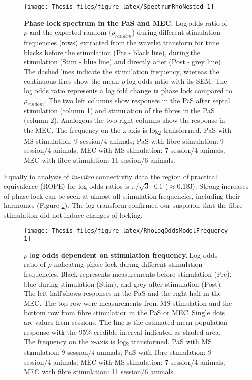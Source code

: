\documentclass[
  12pt,
  a4paper,
  openany]{book}
\begin{document}
\FloatBarrier




\begin{figure}[htbp]

{\centering \texttt{[image: Thesis\_files/figure-latex/SpectrumRhoNested-1]} 

}

\caption[Phase lock spectrum in the PaS and MEC]{\textbf{Phase lock spectrum in the PaS and MEC.} Log odds ratio of \(\rho\) and the expected random (\(\rho_{random}\)) during different stimulation frequencies (rows) extracted from the wavelet transform for time blocks before the stimulation (Pre - black line), during the stimulation (Stim - blue line) and directly after (Post - grey line). The dashed lines indicate the stimulation frequency, whereas the continuous lines show the mean \(\rho\) log odds ratio with its SEM. The log odds ratio represents a log fold change in phase lock compared to \(\rho_{random}\). The two left columns show responses in the PaS after septal stimulation (column 1) and stimulation of the fibres in the PaS (column 2). Analogous the two right columns show the response in the MEC. The frequency on the x-axis is log\textsubscript{2} transformed. PaS with MS stimulation: 9 session/4 animals; PaS with fibre stimulation: 9 session/4 animals; MEC with MS stimulation: 7 session/4 animals; MEC with fibre stimulation: 11 session/6 animals.}\label{fig:SpectrumRhoNested}
\end{figure}

\noindent Equally to analysis of \emph{in-vitro} connectivity data the region of practical equivalence (ROPE) for log odds ratios is \(\pi/\sqrt{3}\cdot0.1\) (\(\approx 0.183\)). Strong increases of phase lock can be seen at almost all stimulation frequencies, including their harmonics (Figure \ref{fig:SpectrumRhoNested}). The log-transform confirmed our suspicion that the fibre stimulation did not induce changes of locking.




\begin{figure}[H]

{\centering \texttt{[image: Thesis\_files/figure-latex/RhoLogOddsModelFrequency-1]} 

}

\caption[\(\rho\) log odds dependent on stimulation frequency]{\(\rho\) \textbf{log odds dependent on stimulation frequency.} Log odds ratio of \(\rho\) indicating phase lock during different stimulation frequencies. Black represents measurements before stimulation (Pre), blue during stimulation (Stim), and grey after stimulation (Post). The left half shows responses in the PaS and the right half in the MEC. The top row were measurements from MS stimulation and the bottom row from fibre stimulation in the PaS or MEC. Single dots are values from sessions. The line is the estimated mean population response with the 95\% credible interval indicated as shaded area. The frequency on the x-axis is log\textsubscript{2} transformed. PaS with MS stimulation: 9 session/4 animals; PaS with fibre stimulation: 9 session/4 animals; MEC with MS stimulation: 7 session/4 animals; MEC with fibre stimulation: 11 session/6 animals.}\label{fig:RhoLogOddsModelFrequency}
\end{figure}
\end{document}
